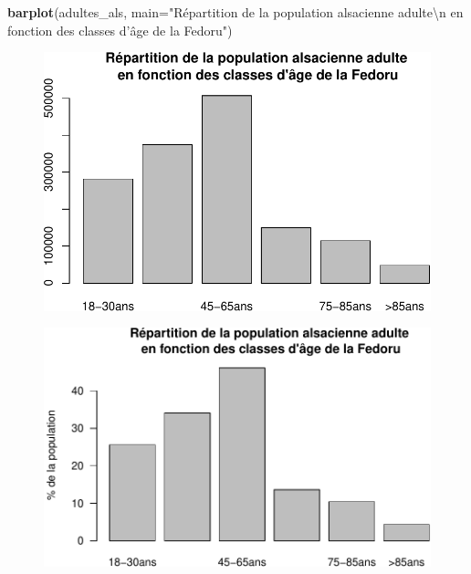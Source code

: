 \documentclass[]{article}
\newenvironment{Shaded}{\begin{snugshade}}{\end{snugshade}}
\newcommand{\KeywordTok}[1]{\textcolor[rgb]{0.13,0.29,0.53}{\textbf{{#1}}}}
\newcommand{\DataTypeTok}[1]{\textcolor[rgb]{0.13,0.29,0.53}{{#1}}}
\newcommand{\DecValTok}[1]{\textcolor[rgb]{0.00,0.00,0.81}{{#1}}}
\newcommand{\CharTok}[1]{\textcolor[rgb]{0.31,0.60,0.02}{{#1}}}
\newcommand{\StringTok}[1]{\textcolor[rgb]{0.31,0.60,0.02}{{#1}}}
\newcommand{\CommentTok}[1]{\textcolor[rgb]{0.56,0.35,0.01}{\textit{{#1}}}}
\newcommand{\NormalTok}[1]{{#1}}
\begin{document}
\begin{Shaded}
\begin{Highlighting}[]
\KeywordTok{barplot}\NormalTok{(adultes_als, }\DataTypeTok{main=}\StringTok{"Répartition de la population alsacienne adulte}\CharTok{\textbackslash{}n}\StringTok{ en fonction des classes d'âge de la Fedoru"}\NormalTok{)}
\end{Highlighting}
\end{Shaded}

\begin{figure}[htbp]
\centering
\includegraphics{./age_files/figure-latex/pop_als-4.pdf}
\end{figure}

\begin{Shaded}
\end{Shaded}

\begin{figure}[htbp]
\centering
\includegraphics{./age_files/figure-latex/pop_als-5.pdf}
\end{figure}
\end{document}

